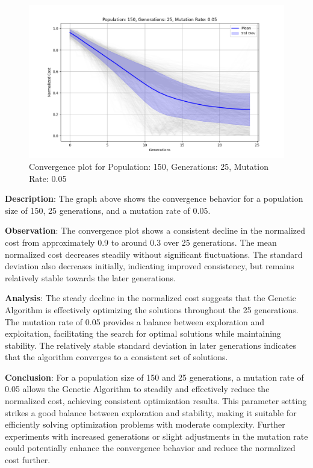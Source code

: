 \documentclass{article}
\begin{document}
    \begin{figure}[H]
        \centering
        \includegraphics[width=\textwidth]{genetic_algorithm/Population_150_Generations_25_MutationRate_0.05}
        \caption{Convergence plot for Population: 150, Generations: 25, Mutation Rate: 0.05}
        \label{fig:ga_150_25_05}
    \end{figure}

    \textbf{Description}: The graph above shows the convergence behavior for a population size of 150, 25 generations, and a mutation rate of 0.05.

    \textbf{Observation}: The convergence plot shows a consistent decline in the normalized cost from approximately 0.9 to around 0.3 over 25 generations. The mean normalized cost decreases steadily without significant fluctuations. The standard deviation also decreases initially, indicating improved consistency, but remains relatively stable towards the later generations.

    \textbf{Analysis}: The steady decline in the normalized cost suggests that the Genetic Algorithm is effectively optimizing the solutions throughout the 25 generations. The mutation rate of 0.05 provides a balance between exploration and exploitation, facilitating the search for optimal solutions while maintaining stability. The relatively stable standard deviation in later generations indicates that the algorithm converges to a consistent set of solutions.

    \textbf{Conclusion}: For a population size of 150 and 25 generations, a mutation rate of 0.05 allows the Genetic Algorithm to steadily and effectively reduce the normalized cost, achieving consistent optimization results. This parameter setting strikes a good balance between exploration and stability, making it suitable for efficiently solving optimization problems with moderate complexity. Further experiments with increased generations or slight adjustments in the mutation rate could potentially enhance the convergence behavior and reduce the normalized cost further.
\end{document}
